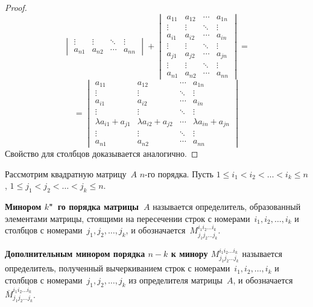 \begin{itemize}
\begin{proof}
\begin{equation*}
\begin{vmatrix}
	\vdots & \vdots & \ddots & \vdots \\
	a_{n1} & a_{n2} & \cdots & a_{nn}
	\end{vmatrix} +
	\begin{vmatrix}
	a_{11} & a_{12} & \cdots & a_{1n} \\
	\vdots & \vdots & \ddots & \vdots \\
	a_{i1} & a_{i2} & \cdots & a_{in} \\
	\vdots & \vdots & \ddots & \vdots \\
	a_{j1} & a_{j2} & \cdots & a_{jn} \\
	\vdots & \vdots & \ddots & \vdots \\
	a_{n1} & a_{n2} & \cdots & a_{nn}
	\end{vmatrix} =
	\end{equation*}
	\begin{equation*}
	= \begin{vmatrix}
	a_{11} & a_{12} & \cdots & a_{1n} \\
	\vdots & \vdots & \ddots & \vdots \\
	a_{i1} & a_{i2} & \cdots & a_{in} \\
	\vdots & \vdots & \ddots & \vdots \\
	\lambda a_{i1} + a_{j1} & \lambda a_{i2} + a_{j2} & \cdots & \lambda a_{in} + a_{jn} \\
	\vdots & \vdots & \ddots & \vdots \\
	a_{n1} & a_{n2} & \cdots & a_{nn}
	\end{vmatrix}
	\end{equation*}
	Свойство для столбцов доказывается аналогично.
	\end{proof}
\end{itemize}

Рассмотрим квадратную матрицу~$A$ $n$-го порядка.
Пусть $1 \leqslant i_1 < i_2 < \ldots < i_k \leqslant n$, $1 \leqslant j_1 < j_2 < \ldots < j_k \leqslant n$.

 \textbf{Минором $k$"~го порядка матрицы~$A$} называется определитель, образованный элементами матрицы, стоящими на пересечении строк с номерами~$i_1, i_2, \ldots, i_k$ и столбцов с номерами~$j_1, j_2, \ldots, j_k$, и обозначается~$M_{j_1 j_2 \ldots j_k}^{i_1 i_2 \ldots i_k}$.

\textbf{Дополнительным минором порядка $n - k$ к минору $M_{j_1 j_2 \ldots j_k}^{i_1 i_2 \ldots i_k}$} называется определитель, полученный вычеркиванием строк с номерами~$i_1, i_2, \ldots, i_k$ и столбцов с номерами~$j_1, j_2, \ldots, j_k$ из определителя матрицы~$A$, и обозначается $\overline M_{j_1 j_2 \ldots j_k}^{i_1 i_2 \ldots i_k}$.


